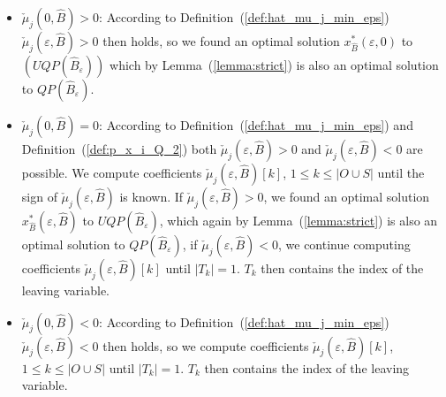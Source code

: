 \documentclass[a4paper]{article}
\begin{document}
\begin{itemize}
\item $\check{\mu}_{j}(0, \hat{B}) > 0$:
According to Definition~(\ref{def:hat_mu_j_min_eps})
$\check{\mu}_{j}(\varepsilon, \hat{B}) > 0$ then holds, so we found an optimal
solution $x_{\hat{B}}^{*}(\varepsilon, 0)$ to $(UQP(\hat{B}_{\varepsilon}))$
which by Lemma~(\ref{lemma:strict}) is also an optimal solution to
$QP(\hat{B}_{\varepsilon})$.

\item $\check{\mu}_{j}(0, \hat{B}) = 0$:
According to Definition~(\ref{def:hat_mu_j_min_eps}) and
Definition~(\ref{def:p_x_i_Q_2}) both
$\check{\mu}_{j}(\varepsilon, \hat{B}) > 0$ and
$\check{\mu}_{j}(\varepsilon, \hat{B}) < 0$ are possible.
We compute coefficients $\check{\mu}_{j}(\varepsilon, \hat{B})[k]$,
$1 \leq k \leq \left|O \cup S\right|$ until the sign of
$\check{\mu}_{j}(\varepsilon, \hat{B})$ is known. 
If $\check{\mu}_{j}(\varepsilon, \hat{B}) > 0$, we found an optimal solution
$x_{\hat{B}}^{*}(\varepsilon, \hat{B})$ to $UQP(\hat{B}_{\varepsilon})$,
which again by Lemma~(\ref{lemma:strict}) is also an optimal solution to
$QP(\hat{B}_{\varepsilon})$,
if $\check{\mu}_{j}(\varepsilon, \hat{B}) < 0$, we continue computing
coefficients $\check{\mu}_{j}(\varepsilon, \hat{B})[k]$ until
$\left|T_{k}\right|=1$. $T_{k}$ then contains the index of the leaving
variable.

\item $\check{\mu}_{j}(0, \hat{B}) < 0$:
According to Definition~(\ref{def:hat_mu_j_min_eps})
$\check{\mu}_{j}(\varepsilon, \hat{B}) < 0$ then holds, so we compute
coefficients $\check{\mu}_{j}(\varepsilon, \hat{B})[k]$,
$1 \leq k \leq \left|O \cup S\right|$ until $\left|T_{k}\right|=1$.
$T_{k}$ then contains the index of the leaving
variable.
\end{itemize}
\end{document}
